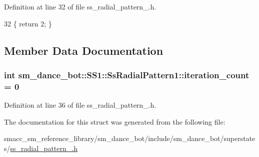 Definition at line 32 of file ss\+\_\+radial\+\_\+pattern\+\_.\+h.


\begin{DoxyCode}
32 \{ \textcolor{keywordflow}{return} 2; \}
\end{DoxyCode}


\subsection{Member Data Documentation}
\subsubsection[{\texorpdfstring{iteration\+\_\+count}{iteration_count}}]{\setlength{\rightskip}{0pt plus 5cm}int sm\+\_\+dance\+\_\+bot\+::\+S\+S1\+::\+Ss\+Radial\+Pattern1\+::iteration\+\_\+count = 0}\hypertarget{structsm__dance__bot_1_1SS1_1_1SsRadialPattern1_a148a819e2406f494f14afae15e1497b5}{}\label{structsm__dance__bot_1_1SS1_1_1SsRadialPattern1_a148a819e2406f494f14afae15e1497b5}


Definition at line 36 of file ss\+\_\+radial\+\_\+pattern\+\_.\+h.



The documentation for this struct was generated from the following file\+:\begin{DoxyCompactItemize}
\item 
smacc\+\_\+sm\+\_\+reference\+\_\+library/sm\+\_\+dance\+\_\+bot/include/sm\+\_\+dance\+\_\+bot/superstates/\hyperlink{ss__radial__pattern__1_8h}{ss\+\_\+radial\+\_\+pattern\+\_.\+h}\end{DoxyCompactItemize}
